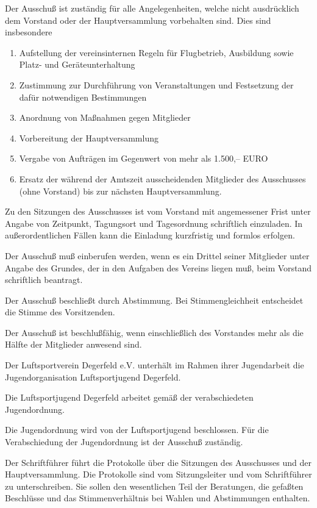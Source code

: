 \documentclass[11pt,a4paper,parskip=half]{scrartcl}
\begin{document}
\begin{contract}
\begin{multicols}{2}
		Der Ausschuß ist zuständig für alle Angelegenheiten,
    welche nicht ausdrücklich dem Vorstand oder der Hauptversammlung vorbehalten sind.
    Dies sind insbesondere
    \begin{enumerate}[label=\alph*)]
      \item Aufstellung der vereinsinternen Regeln für Flugbetrieb,
      Ausbildung sowie Platz- und Geräteunterhaltung
      \item Zustimmung zur Durchführung von Veranstaltungen und Festsetzung der dafür notwendigen Bestimmungen
      \item Anordnung von Maßnahmen gegen Mitglieder
      \item Vorbereitung der Hauptversammlung
      \item Vergabe von Aufträgen im Gegenwert von mehr als 1.500,-- EURO
      \item Ersatz der während der Amtszeit ausscheidenden Mitglieder des Ausschusses (ohne Vorstand) bis zur nächsten Hauptversammlung.
    \end{enumerate}

		Zu den Sitzungen des Ausschusses ist vom Vorstand mit angemessener Frist unter Angabe von Zeitpunkt,
    Tagungsort und Tagesordnung schriftlich einzuladen.
    In außerordentlichen Fällen kann die Einladung kurzfristig und formlos erfolgen.

		Der Ausschuß muß einberufen werden,
    wenn es ein Drittel seiner Mitglieder unter Angabe des Grundes,
    der in den Aufgaben des Vereins liegen muß,
    beim Vorstand schriftlich beantragt.

		Der Ausschuß beschließt durch Abstimmung.
    Bei Stimmengleichheit entscheidet die Stimme des Vorsitzenden.

		Der Ausschuß ist beschlußfähig,
    wenn einschließlich des Vorstandes mehr als die Hälfte der Mitglieder anwesend sind.

		Der Luftsportverein Degerfeld e.V. unterhält im Rahmen ihrer Jugendarbeit die Jugendorganisation Luftsportjugend Degerfeld.

		Die Luftsportjugend Degerfeld arbeitet gemäß der verabschiedeten Jugendordnung.

		Die Jugendordnung wird von der Luftsportjugend beschlossen. Für die Verabschiedung der Jugendordnung ist der Ausschuß zuständig.

		Der Schriftführer führt die Protokolle über die Sitzungen des Ausschusses und der Hauptversammlung.
    Die Protokolle sind vom Sitzungsleiter und vom Schriftführer zu unterschreiben.
    Sie sollen den wesentlichen Teil der Beratungen,
    die gefaßten Beschlüsse und das Stimmenverhältnis bei Wahlen und Abstimmungen enthalten.


\end{multicols}
\end{contract}
\end{document}
